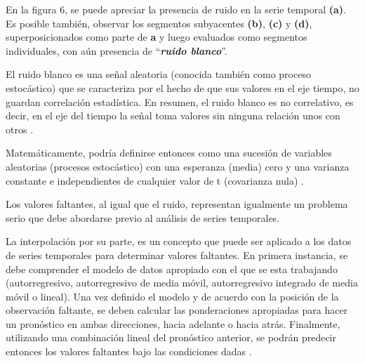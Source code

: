 En la figura 6, se puede apreciar la presencia de ruido en la serie temporal \textbf{(a)}. Es posible tambi\'en, observar los segmentos subyacentes \textbf{(b)}, \textbf{(c)} y \textbf{(d)}, superposicionados como parte de \textbf{a} y luego evaluados como segmentos individuales, con a\'un presencia de \enquote{\textit{\textbf{ruido blanco}}}.\par
El ruido blanco es una se\~nal aleatoria (conocida tambi\'en como proceso estoc\'astico) que se caracteriza por el hecho de que sus valores en el eje tiempo, no guardan correlaci\'on estad\'istica. En resumen, el ruido blanco es no correlativo, es decir, en el eje del tiempo la se\~nal toma valores sin ninguna relaci\'on unos con otros \cite{concepts}.\par
Matem\'aticamente, podr\'ia definirse entonces como una sucesi\'on de variables aleatorias (procesos estoc\'astico) con una esperanza (media) cero y una varianza constante e independientes de cualquier valor de t (covarianza nula) \cite{noise}.\par
Los valores faltantes, al igual que el ruido, representan igualmente un problema serio que debe abordarse previo al an\'alisis de series temporales.\par
La interpolaci\'on por su parte, es un concepto que puede ser aplicado a los datos de series temporales para determinar valores faltantes. En primera instancia, se debe comprender el modelo de datos apropiado con el que se esta trabajando (autorregresivo, autorregresivo de media m\'ovil, autorregresivo integrado de media m\'ovil o lineal). Una vez definido el modelo y de acuerdo con la posici\'on de la observaci\'on faltante, se deben calcular las ponderaciones apropiadas para hacer un pron\'ostico en ambas direcciones, hacia adelante o hacia atr\'as. Finalmente, utilizando una combinaci\'on lineal del pron\'ostico anterior, se podr\'an predecir entonces los valores faltantes bajo las condiciones dadas \cite{concepts}.